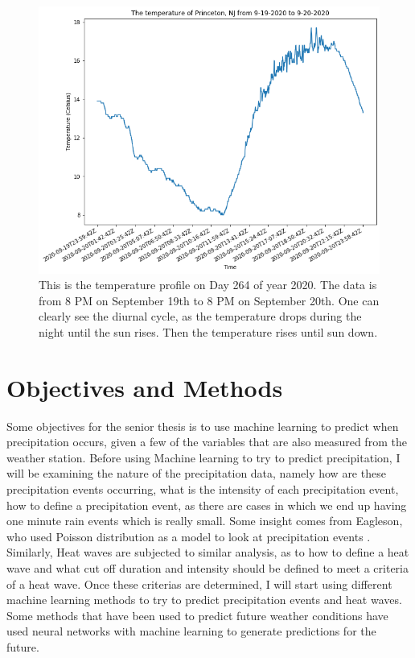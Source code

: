 \documentclass[12pt]{article}
\begin{document}
	\begin{figure}[H]
		\centering
		\includegraphics[width=130mm]{Figures/Day_temp_profile.png}
		\caption{This is the temperature profile on Day 264 of year 2020. The data is from 8 PM on September 19th to 8 PM on September 20th. One can clearly see the diurnal cycle, as the temperature drops during the night until the sun rises. Then the temperature rises until sun down. }
	\end{figure}
	\section{Objectives and Methods}
	Some objectives for the senior thesis is to use machine learning to predict when precipitation occurs, given a few of the variables that are also measured from the weather station. Before using Machine learning to try to predict precipitation, I will be examining the nature of the precipitation data, namely how are these precipitation events occurring, what is the intensity of each precipitation event, how to define a precipitation event, as there are cases in which we end up having one minute rain events which is really small. Some insight comes from Eagleson, who used Poisson distribution as a model to look at precipitation events \cite{Eagleson}. Similarly, Heat waves are subjected to similar analysis, as to how to define a heat wave and what cut off duration and intensity should be defined to meet a criteria of a heat wave. Once these criterias are determined, I will start using different machine learning methods to try to predict precipitation events and heat waves. Some methods that have been used to predict future weather conditions have used neural networks with machine learning to generate predictions for the future. 
	
\end{document}
